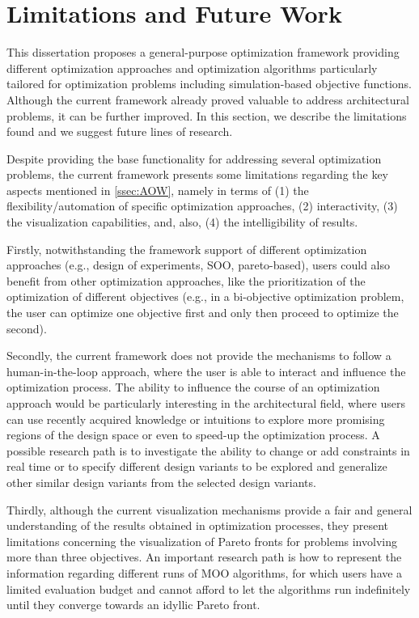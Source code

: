 \section{Limitations and Future Work}
This dissertation proposes a general-purpose optimization framework providing different optimization approaches and optimization algorithms particularly tailored for optimization problems including simulation-based objective functions. Although the current framework already proved valuable to address architectural problems, it can be further improved. In this section, we describe the limitations found and we suggest future lines of research.

Despite providing the base functionality for addressing several optimization problems, the current framework presents some limitations regarding the key aspects mentioned in \cref{ssec:AOW}, namely in terms of (1) the flexibility/automation of specific optimization approaches, (2) interactivity, (3) the visualization capabilities, and, also, (4) the intelligibility of results.

Firstly, notwithstanding the framework support of different optimization approaches (e.g., design of experiments, \ac{SOO}, pareto-based), users could also benefit from other optimization approaches, like the prioritization of the optimization of different objectives (e.g., in a bi-objective optimization problem, the user can optimize one objective first and only then proceed to optimize the second). 

Secondly, the current framework does not provide the mechanisms to follow a human-in-the-loop approach, where the user is able to interact and influence the optimization process. The ability to influence the course of an optimization approach would be particularly interesting in the architectural field, where users can use recently acquired knowledge or intuitions to explore more promising regions of the design space or even to speed-up the optimization process. A possible research path is to investigate the ability to change or add constraints in real time or to specify different design variants to be explored and generalize other similar design variants from the selected design variants.

Thirdly, although the current visualization mechanisms provide a fair and general understanding of the results obtained in optimization processes, they present limitations concerning the visualization of Pareto fronts for problems involving more than three objectives. An important research path is how to represent the information regarding different runs of \ac{MOO} algorithms, for which users have a limited evaluation budget and cannot afford to let the algorithms run indefinitely until they converge towards an idyllic Pareto front. %

